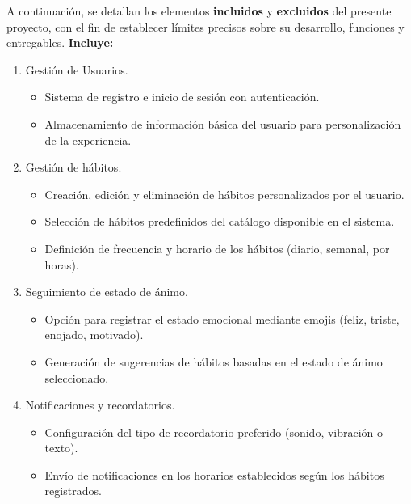 \documentclass[letterpaper,12pt,oneside]{article}
\begin{document}
        \newline \newline
        A continuación, se detallan los elementos \textbf{incluidos} y \textbf{excluidos} del presente proyecto, con el fin de establecer límites precisos sobre su desarrollo, funciones y entregables.
        \newline \newline
        \textbf{Incluye:}
        \begin{enumerate}
            \item Gestión de Usuarios.
                \begin{itemize}
                    \item Sistema de registro e inicio de sesión con autenticación.
                    \item Almacenamiento de información básica del usuario para personalización de la experiencia.
                \end{itemize}
            \item Gestión de hábitos.
                \begin{itemize}
                    \item Creación, edición y eliminación de hábitos personalizados por el usuario.
                    \item Selección de hábitos predefinidos del catálogo disponible en el sistema.
                    \item Definición de frecuencia y horario de los hábitos (diario, semanal, por horas).
                \end{itemize}
            \item Seguimiento de estado de ánimo.
                \begin{itemize}
                    \item Opción para registrar el estado emocional mediante emojis (feliz, triste, enojado, motivado).
                    \item Generación de sugerencias de hábitos basadas en el estado de ánimo seleccionado.
                \end{itemize}
            \item Notificaciones y recordatorios.
                \begin{itemize}
                    \item Configuración del tipo de recordatorio preferido (sonido, vibración o texto).
                    \item Envío de notificaciones en los horarios establecidos según los hábitos registrados.

\end{itemize}
\end{enumerate}
\end{document}
